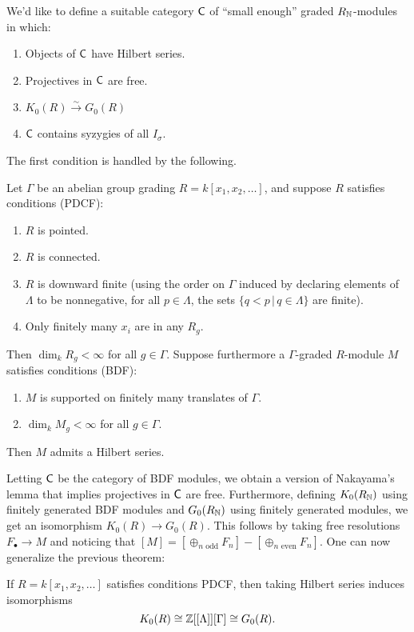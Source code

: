 \documentclass{amsart}
\begin{document}
We'd like to define a suitable category $\mathsf{C}$ of ``small enough'' graded $R_{\mathbb{N}}$-modules in which:
\begin{enumerate}
	\item Objects of $\mathsf{C}$ have Hilbert series.
	\item Projectives in $\mathsf{C}$ are free.
	\item $K_0(R) \xrightarrow{\sim} G_0(R)$
	\item $\mathsf{C}$ contains syzygies of all $I_\sigma$.
\end{enumerate}

The first condition is handled by the following.

\begin{prop}
	Let $\Gamma$ be an abelian group grading $R = k[x_1, x_2, \dots]$, and suppose $R$ satisfies conditions (PDCF):
	\begin{enumerate}
		\item $R$ is pointed.
		\item $R$ is connected.
		\item $R$ is downward finite (using the order on $\Gamma$ induced by declaring elements of $\Lambda$ to be nonnegative, for all $p \in \Lambda$, the sets $\{ q < p \,|\, q \in \Lambda \}$ are finite).
		\item Only finitely many $x_i$ are in any $R_g$.
	\end{enumerate}
	Then $\dim_k R_g < \infty$ for all $g \in \Gamma$.
	Suppose furthermore a $\Gamma$-graded $R$-module $M$ satisfies conditions (BDF):
	\begin{enumerate}
		\item $M$ is supported on finitely many translates of $\Gamma$.
		\item $\dim_k M_g < \infty$ for all $g \in \Gamma$.
	\end{enumerate}
	Then $M$ admits a Hilbert series.
\end{prop}

Letting $\mathsf{C}$ be the category of BDF modules, we obtain a version of Nakayama's lemma that implies projectives in $\mathsf{C}$ are free.
Furthermore, defining $K_0(R_{\mathbb{N}})$ using finitely generated BDF modules and $G_0(R_{\mathbb{N}})$ using finitely generated modules, we get an isomorphism $K_0(R) \to G_0(R)$.
This follows by taking free resolutions $F_\bullet \to M$ and noticing that $[M] = \left[\oplus_{n \textrm{ odd}} F_n\right] - \left[\oplus_{n \textrm{ even}} F_n\right]$.
One can now generalize the previous theorem:

\begin{thm}
	If $R = k[x_1, x_2, \dots]$ satisfies conditions PDCF, then taking Hilbert series induces isomorphisms 
	\[
		K_0(R) \cong \mathbb{Z}[[\Lambda]][\Gamma] \cong G_0(R).
	\]
\end{thm}
\end{document}
